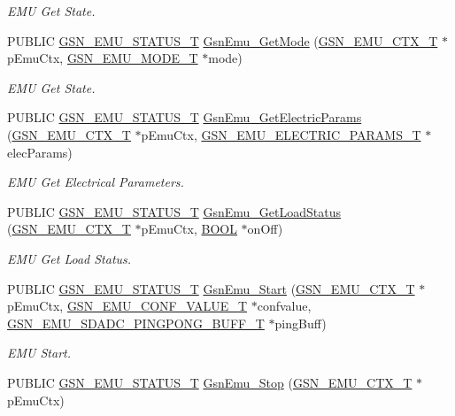 \begin{DoxyCompactItemize}
\begin{DoxyCompactList}\small\item\em EMU Get State. \end{DoxyCompactList}\item 
PUBLIC \hyperlink{a00490_aeda27e2bd7f74b1b9748e313d272033e}{GSN\_\-EMU\_\-STATUS\_\-T} \hyperlink{a00663_ga04eb7d0e39bd40dc1e3b10be77de73ba}{GsnEmu\_\-GetMode} (\hyperlink{a00059}{GSN\_\-EMU\_\-CTX\_\-T} $\ast$pEmuCtx, \hyperlink{a00663_gafbaa4d30aa4b736f3465344d6a5935b0}{GSN\_\-EMU\_\-MODE\_\-T} $\ast$mode)
\begin{DoxyCompactList}\small\item\em EMU Get State. \end{DoxyCompactList}\item 
PUBLIC \hyperlink{a00490_aeda27e2bd7f74b1b9748e313d272033e}{GSN\_\-EMU\_\-STATUS\_\-T} \hyperlink{a00663_ga95c5ac4e1742d243bfa2722e75a01e73}{GsnEmu\_\-GetElectricParams} (\hyperlink{a00059}{GSN\_\-EMU\_\-CTX\_\-T} $\ast$pEmuCtx, \hyperlink{a00060}{GSN\_\-EMU\_\-ELECTRIC\_\-PARAMS\_\-T} $\ast$elecParams)
\begin{DoxyCompactList}\small\item\em EMU Get Electrical Parameters. \end{DoxyCompactList}\item 
PUBLIC \hyperlink{a00490_aeda27e2bd7f74b1b9748e313d272033e}{GSN\_\-EMU\_\-STATUS\_\-T} \hyperlink{a00663_ga600b62bce05579cdc2fd7d12b20c65df}{GsnEmu\_\-GetLoadStatus} (\hyperlink{a00059}{GSN\_\-EMU\_\-CTX\_\-T} $\ast$pEmuCtx, \hyperlink{a00660_ga1f04022c0a182c51c059438790ea138c}{BOOL} $\ast$onOff)
\begin{DoxyCompactList}\small\item\em EMU Get Load Status. \end{DoxyCompactList}\item 
PUBLIC \hyperlink{a00490_aeda27e2bd7f74b1b9748e313d272033e}{GSN\_\-EMU\_\-STATUS\_\-T} \hyperlink{a00663_gace908fb8fb14ee6186110f2641dbf072}{GsnEmu\_\-Start} (\hyperlink{a00059}{GSN\_\-EMU\_\-CTX\_\-T} $\ast$pEmuCtx, \hyperlink{a00058}{GSN\_\-EMU\_\-CONF\_\-VALUE\_\-T} $\ast$confvalue, \hyperlink{a00067}{GSN\_\-EMU\_\-SDADC\_\-PINGPONG\_\-BUFF\_\-T} $\ast$pingBuff)
\begin{DoxyCompactList}\small\item\em EMU Start. \end{DoxyCompactList}\item 
PUBLIC \hyperlink{a00490_aeda27e2bd7f74b1b9748e313d272033e}{GSN\_\-EMU\_\-STATUS\_\-T} \hyperlink{a00663_ga07157b87c6421781bd45756fd80d6702}{GsnEmu\_\-Stop} (\hyperlink{a00059}{GSN\_\-EMU\_\-CTX\_\-T} $\ast$pEmuCtx)

\end{DoxyCompactItemize}
